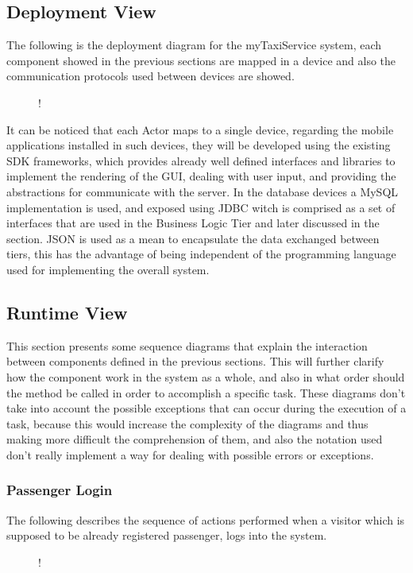 \subsection{Deployment View}
The following is the deployment diagram for the myTaxiService system, each component showed in the previous sections are mapped in a device and also the communication protocols used between devices are showed.
\begin{figure}[H]
	\centering
	\resizebox{6in}
	{!}{}
\end{figure}
It can be noticed that each Actor maps to a single device, regarding the mobile applications installed in such devices, they will be developed using the existing SDK frameworks, which provides already well defined interfaces and libraries to implement the rendering of the GUI, dealing with user input, and providing the abstractions for communicate with the server. \newline
In the database devices a MySQL implementation is used, and exposed using JDBC witch is comprised as a set of interfaces that are used in the Business Logic Tier and later discussed in the  section. \newline
JSON is used as a mean to encapsulate the data exchanged between tiers, this has the advantage of being independent of the programming language used for implementing the overall system. 
\subsection{Runtime View}
This section presents some sequence diagrams that explain the interaction between components defined in the previous sections. This will further clarify how the component work in the system as a whole, and also in what order should the method be called in order to accomplish a specific task. \newline
These diagrams don't take into account the possible exceptions that can occur during the execution of a task, because this would increase the complexity of the diagrams and thus making more difficult the comprehension of them, and also the notation used don't really implement a way for dealing with possible errors or exceptions.
\subsubsection{Passenger Login}
The following describes the sequence of actions performed when a visitor which is supposed to be already registered passenger, logs into the system. 
\begin{figure}[H]
	\small
	\centering
	\resizebox{6in}
	{!}{}
	\end{figure}
\break
